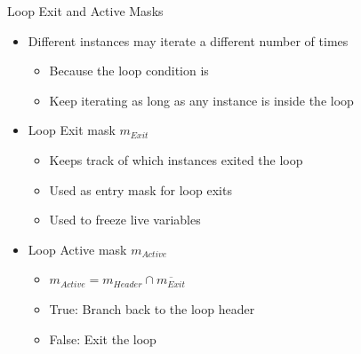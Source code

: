 
\begin{frame}{Loop Exit and Active Masks}

\begin{itemize}
    \item Different instances may iterate a different number of times
    \begin{itemize}
        \item Because the loop condition is 
        \item Keep iterating as long as any instance is inside the loop
    \end{itemize}
    \item Loop Exit mask $m_{Exit}$
    \begin{itemize}
        \item Keeps track of which instances exited the loop
        \item Used as entry mask for loop exits
        \item Used to freeze live variables
    \end{itemize}
    \item Loop Active mask $m_{Active}$
    \begin{itemize}
        \item $m_{Active} = m_{Header} \cap \overline{m_{Exit}}$
        \item True: Branch back to the loop header
        \item False: Exit the loop
    \end{itemize}
\end{itemize}

\end{frame}


